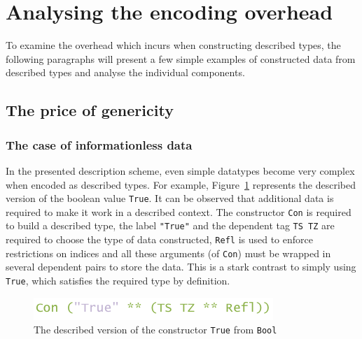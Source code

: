\documentclass{ituthesis}
\newcommand{\ttconstructor}[1]{\textcolor{constructor-color}{\texttt{#1}}}
\newcommand{\tttype}[1]{\textcolor{type-color}{\texttt{#1}}}
\newcommand{\ttliteral}[1]{\textcolor{literal-color}{\texttt{#1}}}
\theoremstyle{break}
\begin{document}
\section{Analysing the encoding overhead}
\label{sec:Analysingtheencodingoverhead}

To examine the overhead which incurs when constructing described types, the following paragraphs will present a few simple examples of constructed data from described types and analyse the individual components.

\subsection{The price of genericity}
\label{sub:The price of genericity}

\subsubsection{The case of informationless data}
\label{ssub:The case of informationless data}

In the presented description scheme, even simple datatypes become very complex when encoded as described types.
For example, Figure~\ref{fig:overheadbool} represents the described version of the boolean value \ttconstructor{True}.
It can be observed that additional data is required to make it work in a described context.
The constructor \ttconstructor{Con} is required to build a described type, the label \ttliteral{"True"} and the dependent tag \ttconstructor{TS~TZ} are required to choose the type of data constructed, \ttconstructor{Refl} is used to enforce restrictions on indices
and all these arguments (of \ttconstructor{Con}) must be wrapped in several dependent pairs to store the data.
This is a stark contrast to simply using \ttconstructor{True}, which satisfies the required type by definition.

\begin{figure}[ht]
\begin{center}
    \includegraphics[scale=0.5]{Figures/GenericsOverheadBool.png}
\end{center}
\caption{The described version of the constructor \ttconstructor{True} from \tttype{Bool}}
\label{fig:overheadbool}
\end{figure}
\end{document}
